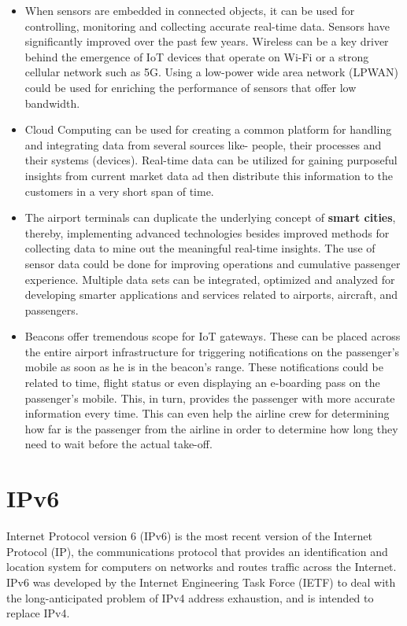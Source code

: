 \documentclass[a4paper,12pt]{book}
\begin{document}
\begin{itemize}
\item{ When sensors are embedded in connected objects, it can be used for controlling, monitoring and collecting accurate real-time data. Sensors have significantly improved over the past few years. Wireless can be a key driver behind the emergence of IoT devices that operate on Wi-Fi or a strong cellular network such as 5G. Using a low-power wide area network (LPWAN) could be used for enriching the performance of sensors that offer low bandwidth.}
\item{ Cloud Computing can be used for creating a common platform for handling and integrating data from several sources like- people, their processes and their systems (devices). Real-time data can be utilized for gaining purposeful insights from current market data ad then distribute this information to the customers in a very short span of time.}
\item{ The airport terminals can duplicate the underlying concept of \textbf{smart cities}, thereby, implementing advanced technologies besides improved methods for collecting data to mine out the meaningful real-time insights. The use of sensor data could be done for improving operations and cumulative passenger experience. Multiple data sets can be integrated, optimized and analyzed for developing smarter applications and services related to airports, aircraft, and passengers.}
\item{ Beacons offer tremendous scope for IoT gateways. These can be placed across the entire airport infrastructure for triggering notifications on the passenger’s mobile as soon as he is in the beacon’s range. These notifications could be related to time, flight status or even displaying an e-boarding pass on the passenger’s mobile. This, in turn, provides the passenger with more accurate information every time. This can even help the airline crew for determining how far is the passenger from the airline in order to determine how long they need to wait before the actual take-off.}
\end{itemize}

\section{IPv6}

Internet Protocol version 6 (IPv6) is the most recent version of the Internet Protocol (IP), the communications protocol that provides an identification and location system for computers on networks and routes traffic across the Internet. IPv6 was developed by the Internet Engineering Task Force (IETF) to deal with the long-anticipated problem of IPv4 address exhaustion, and is intended to replace IPv4\footnotemark{}.
\end{document}

